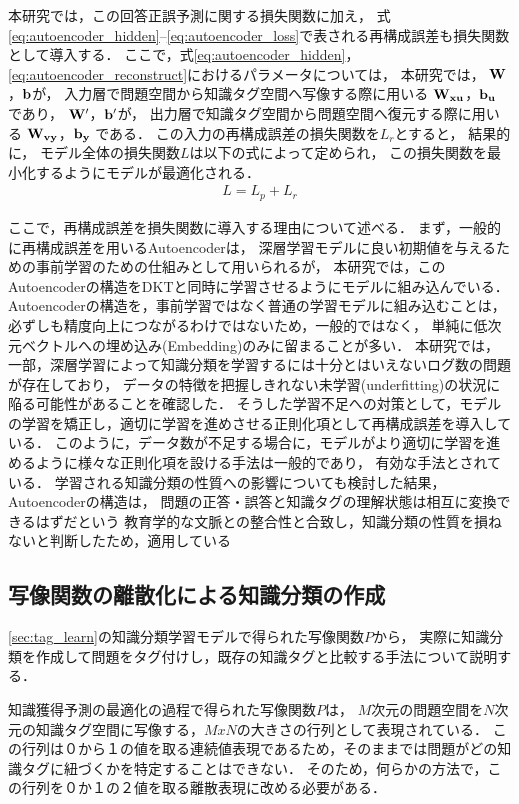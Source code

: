 本研究では，この回答正誤予測に関する損失関数に加え，
式\ref{eq:autoencoder_hidden}--\ref{eq:autoencoder_loss}で表される再構成誤差も損失関数として導入する．
ここで，式\ref{eq:autoencoder_hidden}，\ref{eq:autoencoder_reconstruct}におけるパラメータについては，
本研究では，
${\bf W}$，${\bf b}$が，
入力層で問題空間から知識タグ空間へ写像する際に用いる
${\bf W_{xu}}$，${\bf b_u}$
であり，
${\bf W'}$，${\bf b'}$が，
出力層で知識タグ空間から問題空間へ復元する際に用いる
${\bf W_{vy}}$，${\bf b_y}$
である．
この入力の再構成誤差の損失関数を$L_r$とすると，
結果的に，
モデル全体の損失関数$L$は以下の式によって定められ，
この損失関数を最小化するようにモデルが最適化される．
\begin{eqnarray}
\label{eq:total_loss}
{L = L_p + L_r}
\end{eqnarray}


ここで，再構成誤差を損失関数に導入する理由について述べる．
まず，一般的に再構成誤差を用いるAutoencoderは，
深層学習モデルに良い初期値を与えるための事前学習のための仕組みとして用いられるが，
本研究では，このAutoencoderの構造をDKTと同時に学習させるようにモデルに組み込んでいる．
Autoencoderの構造を，事前学習ではなく普通の学習モデルに組み込むことは，
必ずしも精度向上につながるわけではないため，一般的ではなく，
単純に低次元ベクトルへの埋め込み(Embedding)のみに留まることが多い．
本研究では，
一部，深層学習によって知識分類を学習するには十分とはいえないログ数の問題が存在しており，
データの特徴を把握しきれない未学習(underfitting)の状況に陥る可能性があることを確認した．
そうした学習不足への対策として，モデルの学習を矯正し，適切に学習を進めさせる正則化項として再構成誤差を導入している．
このように，データ数が不足する場合に，モデルがより適切に学習を進めるように様々な正則化項を設ける手法は一般的であり，
有効な手法とされている．
学習される知識分類の性質への影響についても検討した結果，
Autoencoderの構造は，
問題の正答・誤答と知識タグの理解状態は相互に変換できるはずだという
教育学的な文脈との整合性と合致し，知識分類の性質を損ねないと判断したため，適用している



\subsection{写像関数の離散化による知識分類の作成}
\ref{sec:tag_learn}の知識分類学習モデルで得られた写像関数$P$から，
実際に知識分類を作成して問題をタグ付けし，既存の知識タグと比較する手法について説明する．


知識獲得予測の最適化の過程で得られた写像関数$P$は，
$M$次元の問題空間を$N$次元の知識タグ空間に写像する，$MxN$の大きさの行列として表現されている．
この行列は０から１の値を取る連続値表現であるため，そのままでは問題がどの知識タグに紐づくかを特定することはできない．
そのため，何らかの方法で，この行列を０か１の２値を取る離散表現に改める必要がある．

